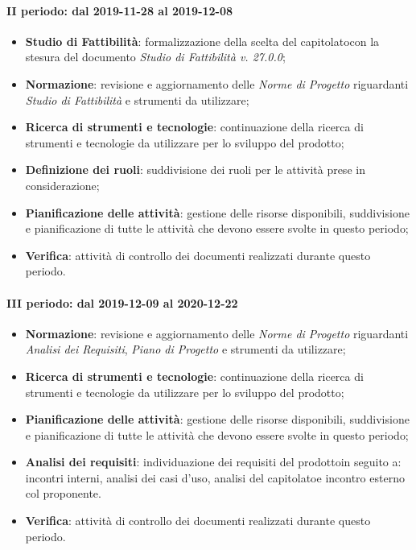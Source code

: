 \paragraph*{II periodo: dal 2019-11-28 al 2019-12-08}
\begin{itemize}
	\item \textbf{Studio di Fattibilità}: formalizzazione della scelta del capitolato\glosp con la stesura del documento \textit{Studio di Fattibilità v. 27.0.0};
	\item \textbf{Normazione}: revisione e aggiornamento delle \textit{Norme di Progetto} riguardanti \textit{Studio di Fattibilità} e strumenti da utilizzare;
	\item \textbf{Ricerca di strumenti e tecnologie}: continuazione della ricerca di strumenti e tecnologie da utilizzare per lo sviluppo del prodotto\glo;
	\item \textbf{Definizione dei ruoli}: suddivisione dei ruoli per le attività prese in considerazione; 
	\item \textbf{Pianificazione delle attività}: gestione delle risorse disponibili, suddivisione e pianificazione di tutte le attività che devono essere svolte in questo periodo;
	\item \textbf{Verifica}: attività di controllo dei documenti realizzati durante questo periodo.
\end{itemize}

\paragraph*{III periodo: dal 2019-12-09 al 2020-12-22}
\begin{itemize}
	\item \textbf{Normazione}: revisione e aggiornamento delle \textit{Norme di Progetto} riguardanti \textit{Analisi dei Requisiti}, \textit{Piano di Progetto} e strumenti da utilizzare;
	\item \textbf{Ricerca di strumenti e tecnologie}: continuazione della ricerca di strumenti e tecnologie da utilizzare per lo sviluppo del prodotto\glo;
	\item \textbf{Pianificazione delle attività}: gestione delle risorse disponibili, suddivisione e pianificazione di tutte le attività che devono essere svolte in questo periodo;
	\item \textbf{Analisi dei requisiti}: individuazione dei requisiti del prodotto\glosp in seguito a: incontri interni, analisi dei casi d'uso\glo, analisi del capitolato\glosp e incontro esterno col proponente.
	\item \textbf{Verifica}: attività di controllo dei documenti realizzati durante questo periodo.
\end{itemize}

